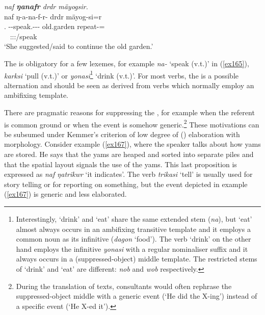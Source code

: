 \begin{exe}
	\ex \emph{naf \textbf{ŋanafr} drdr mäyogsir.}\\
	\glll naf ŋ-a-na-f-r-\Zero{} drdr mäyog-si=r\\
	\Tsg.{\Erg} \M-\Vc-speak.\Rs-\Ndu-\Lk-\Stsg{} old.garden repeat-\Nmlz=\Purp\\
	~ {\footnotesize \Stsg:\Sbj:\Nonpast:\Ipfv/speak} ~ ~\\
	\trans `She suggested/said to continue the old garden.' 
	\label{ex165}
\end{exe}

The   is obligatory for a few lexemes, for example \emph{na-} `speak (v.t.)' in (\ref{ex165}), \emph{karksi} `pull (v.t.)' or \emph{yonasi}\footnote{Interestingly, `drink' and `eat' share the same extended stem (\emph{na}), but `eat' almost always occurs in an ambifixing transitive template and it employs a common noun as its infinitive (\emph{dagon} `food'). The verb `drink' on the other hand employs the infinitive \emph{yonasi} with a regular nominaliser suffix and it always occurs in a (suppressed-object) middle template. The restricted stems of `drink' and `eat' are different: \emph{nob} and \emph{wob} respectively.} `drink (v.t.)'. For most verbs, the   is a possible alternation and should be seen as derived from verbs which normally employ an ambifixing  template.

There are pragmatic reasons for suppressing the , for example when the referent is common ground or when the event is somehow generic.\footnote{During the translation of texts, consultants would often rephrase the suppressed-object middle with a generic event (`He did the X-ing') instead of a specific event (`He X-ed it').} These motivations can be subsumed under Kemmer's criterion of low degree of () elaboration with  morphology. Consider example (\ref{ex167}), where the speaker talks about how yams are stored. He says that the yams are heaped and sorted into separate piles and that the spatial layout signals the use of the yams. This last proposition is expressed as \emph{naf ŋatrikwr} `it indicates'. The verb \emph{trikasi} `tell' is usually used for story telling or for reporting on something, but the event depicted in example (\ref{ex167}) is generic and less elaborated.

